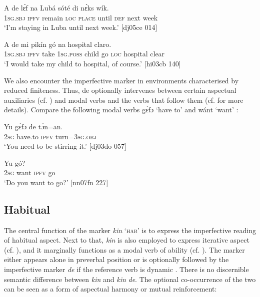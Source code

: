 \ea%
    \label{ex:key:338}
    \gll A    de  lɛ́f    na  Lubá  sóté    di  nɛ́ks    wík.\\
\textsc{1sg.sbj}  \textsc{ipfv}  remain  \textsc{loc}  \textsc{place}  until  \textsc{def}  next    week\\

\glt ‘I’m staying in Luba until next week.’ [dj05ce 014]
\z


\ea%
    \label{ex:key:339}
    \gll \MakeUppercase{A}   de  mi    pikín  gó  na  hospital  claro.\\
\textsc{1sg.sbj}  \textsc{ipfv}  take  \textsc{1sg.poss}  child  go  \textsc{loc}  hospital  clear\\

\glt ‘I would take my child to hospital, of course.’ [hi03cb 140]
\z

We also encounter the imperfective marker in environments characterised by reduced finiteness{\fff}. Thus, de optionally intervenes between certain aspectual auxiliaries (cf. ) and modal verbs and the verbs that follow them (cf.  for more details). Compare the following modal verbs gɛ́fɔ ‘have to’  and wánt ‘want’ :


\ea%
    \label{ex:key:340}
    \gll Yu  gɛ́fɔ    de  tɔ́n=an.\\
\textsc{2sg}  have.to  \textsc{ipfv}  turn=\textsc{3sg.obj}\\

\glt ‘You need to be stirring it.’ [dj03do 057]
\z


\ea%
    \label{ex:key:341}
    \gll Yu     gó?\\
\textsc{2sg}  want  \textsc{ipfv}  go\\


\glt ‘Do you want to go?’ [nn07fn 227]\\
\z
\subsection{Habitual}\label{sec:6.3.5}

The central function of the marker \textit{kin} ‘\textsc{hab}’ is to express the imperfective reading of habitual aspect. Next to that, \textit{kin} is also employed to express iterative aspect (cf. ), and it marginally functions as a modal verb of ability (cf. ). The marker either appears alone in preverbal position  or is optionally followed by the imperfective marker \textit{de} if the reference verb is dynamic . There is no discernible semantic difference between \textit{kin} and \textit{kin} \textit{de}. The optional co-occurrence of the two can be seen as a form of aspectual harmony or mutual reinforcement:


